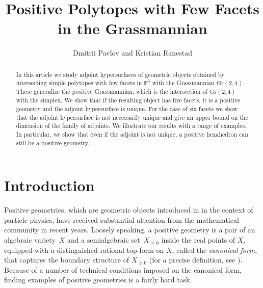 \documentclass[12pt]{extarticle}
\title{Positive Polytopes with Few Facets in the Grassmannian}
\author{Dmitrii Pavlov and Kristian Ranestad}
\date{}
\theoremstyle{definition}
\begin{document}
\maketitle

\begin{abstract}
    In this article we study adjoint hypersurfaces of geometric objects obtained by intersecting simple polytopes with few facets in $\mathbb{P}^5$ with the Grassmannian $\mathrm{Gr}(2,4)$. These generalize the positive Grassmannian, which is the intersection of $\mathrm{Gr}(2,4)$ with the simplex. We show that if the resulting object has five facets, it is a positive geometry and the adjoint hypersurface is unique. For the case of six facets we show that the adjoint hypersurface is not necessarily unique and give an upper bound on the dimension of the family of adjoints. We illustrate our results with a range of examples. In particular, we show that even if the adjoint is not unique, a positive hexahedron can still be a positive geometry. 
\end{abstract}

\section{Introduction}

Positive geometries, which are geometric objects introduced in \cite{arkani2017positive} in the context of particle physics, have received substantial attention from the mathematical community in recent years. Loosely speaking, a positive geometry is a pair of an algebraic variety~$X$ and a semialgebraic set~$X_{\geq 0}$ inside the real points of $X$, equipped with a distinguished rational top-form on $X$, called the \emph{canonical form}, that captures the boundary structure of $X_{\geq 0}$ (for a precise definition, see \cite[Definition 1]{Lam:2022yly}). Because of a number of technical conditions imposed on the canonical form, finding examples of positive geometries is a fairly hard task. 
\end{document}
